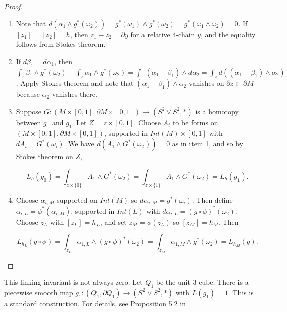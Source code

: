 \documentclass{amsart}
\newtheorem*{theorem 1}{Theorem 1}
\newtheorem*{theorem 2}{Theorem 2}
\newtheorem*{theorem 3}{Theorem 3}
\numberwithin{equation}{section}
\begin{document}
\begin{proof}

 \begin{enumerate}

\item Note that $d ( \alpha_1 \wedge g^*(\omega_2)) = g^*(\omega_1) \wedge g^*(\omega_2) = g^*(\omega_1 \wedge \omega_2) = 0$.   If $[z_1] = [z_2] = h$,  then $z_1 - z_2 = \partial y$ for a relative 4-chain $y$,  and the equality follows from Stokes theorem.

\item If $d \beta_1 = d \alpha_1$,  then $\int_z \beta_1 \wedge g^*(\omega_2) - \int_z \alpha_1 \wedge g^*(\omega_2) = \int_z (\alpha_1 - \beta_1) \wedge d \alpha_2 =  \int_z d \left( (\alpha_1 - \beta_1) \wedge \alpha_2 \right)$.   Apply Stokes theorem and note that $(\alpha_1 - \beta_1) \wedge \alpha_2$ vanishes on $\partial z \subset \partial M$ because $\alpha_2$ vanishes there.

\item Suppose $G: (M \times [0,1],  \partial M \times [0,1]) \rightarrow (S^2 \vee S^2, *)$ is a homotopy between $g_0$ and $g_1$.    Let $Z = z \times [0,1]$.   Choose $A_i$ to be  forms on $(M \times [0,1],  \partial M \times [0,1])$,  supported in $Int(M) \times [0,1]$ with $d A_i = G^*(\omega_i)$.   We have $d( A_1 \wedge G^*(\omega_2)) = 0$ as in item 1,  and so by Stokes theorem on $Z$,  

$$L_h(g_0) =  \int_{z \times \{ 0 \} } A_1 \wedge G^*(\omega_2) = \int_{z \times \{ 1 \} } A_1 \wedge G^*(\omega_2) = L_h(g_1). $$

\item Choose $\alpha_{i, M}$ supported on $Int(M)$ so $d \alpha_{i,M} = g^*(\omega_i)$.   Then define $\alpha_{i,L} = \phi^*(\alpha_{i,M})$,  supported in $Int(L)$ with $d \alpha_{i,L} = (g \circ \phi)^{*}(\omega_2)$.   Choose $z_L$ with $[z_L] = h_L$, and set $z_M = \phi(z_L)$ so $[z_M] = h_M$.   Then 

$$L_{h_L}(g \circ \phi) = \int_{z_L} \alpha_{1,L} \wedge (g \circ \phi)^*(\omega_2) = \int_{z_M} \alpha_{1,M} \wedge g^*(\omega_2) = L_{h_M}(g).$$ 

\end{enumerate}


\end{proof}

This linking invariant is not always zero.    Let $Q_1$ be the unit 3-cube.   There is a piecewise smooth map $g_1: (Q_1,  \partial Q_1) \rightarrow (S^2 \vee S^2, *)$ with $L(g_1) = 1$.   This is a standard construction.   For details,  see Proposition 5.2 in \cite{GH}.
\end{document}

